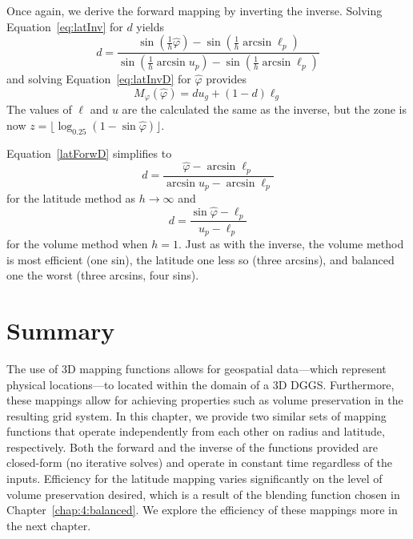 Once again, we derive the forward mapping by inverting the inverse.
Solving Equation~\ref{eq:latInv} for $d$ yields
%
\begin{equation} \label{latForwD}
d = \frac{ \sin \left( \frac{1}{h} \hat{\varphi} \right) - \sin \left( \frac{1}{h} \arcsin \ell_p \right) }{ \sin \left( \frac{1}{h} \arcsin u_p \right) - \sin \left( \frac{1}{h} \arcsin \ell_p \right) }
\end{equation}
%
and solving Equation~\ref{eq:latInvD} for $\hat{\varphi}$ provides
%
\begin{equation} \label{eq:latForw}
M_\varphi (\hat{\varphi}) = d u_g + \left( 1 - d \right) \ell_g
\end{equation}
%
The values of $\ell$ and $u$ are the calculated the same as the inverse, but the zone is now $z = \lfloor \log_{0.25} ( 1 - \sin \hat{\varphi} ) \rfloor$.


Equation~\ref{latForwD} simplifies to
%
\begin{equation*}
d = \frac{ \hat{\varphi} - \arcsin \ell_p }{ \arcsin u_p - \arcsin \ell_p}
\end{equation*}
%
for the latitude method as $h \rightarrow \infty$ and
%
\begin{equation*}
d = \frac{ \sin \hat{\varphi} - \ell_p }{ u_p - \ell_p }
\end{equation*}
%
for the volume method when $h = 1$.
Just as with the inverse, the volume method is most efficient (one sin), the latitude one less so (three arcsins), and balanced one the worst (three arcsins, four sins).


\section{Summary}
The use of 3D mapping functions allows for geospatial data---which represent physical locations---to located within the domain of a 3D DGGS.
Furthermore, these mappings allow for achieving properties such as volume preservation in the resulting grid system.
In this chapter, we provide two similar sets of mapping functions that operate independently from each other on radius and latitude, respectively.
Both the forward and the inverse of the functions provided are closed-form (no iterative solves) and operate in constant time regardless of the inputs.
Efficiency for the latitude mapping varies significantly on the level of volume preservation desired, which is a result of the blending function chosen in Chapter~\ref{chap:4:balanced}.
We explore the efficiency of these mappings more in the next chapter.
